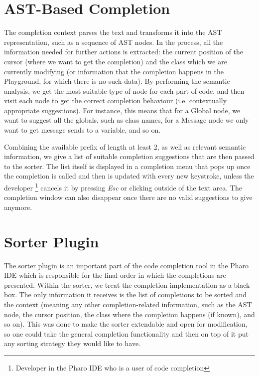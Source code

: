 \section{AST-Based Completion}
\label{sec:PharoCompletion-ASTCompletion}
The completion context parses the text and transforms it into the AST representation, such as a sequence of AST nodes. In the process, all the information needed for further actions is extracted: the current position of the cursor (where we want to get the completion) and the class which we are currently modifying (or information that the completion happens in the Playground, for which there is no such data). By performing the semantic analysis, we get the most suitable type of node for each part of code, and then visit each node to get the correct completion behaviour (i.e. contextually appropriate suggestions). For instance, this means that for a Global node, we want to suggest all the globals, such as class names, for a Message node we only want to get message sends to a variable, and so on.

Combining the available prefix of length at least 2, as well as relevant semantic information, we give a list of suitable completion suggestions that are then passed to the sorter. The list itself is displayed in a completion menu that pops up once the completion is called and then is updated with every new keystroke, unless the developer \footnote{Developer in the Pharo IDE who is a user of code completion} cancels it by pressing \textit{Esc} or clicking outside of the text area. The completion window can also disappear once there are no valid suggestions to give anymore.

\section{Sorter Plugin}
\label{sec:PharoCompletion-SorterPlugin}
The sorter plugin is an important part of the code completion tool in the Pharo IDE which is responsible for the final order in which the completions are presented. Within the sorter, we treat the completion implementation as a black box. The only information it receives is the list of completions to be sorted and the context (meaning any other completion-related information, such as the AST node, the cursor position, the class where the completion happens (if known), and so on). This was done to make the sorter extendable and open for modification, so one could take the general completion functionality and then on top of it put any sorting strategy they would like to have.

